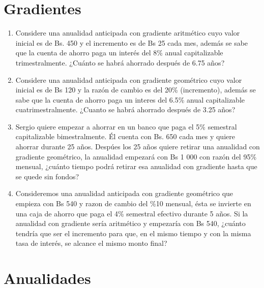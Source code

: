 \documentclass{article}
\begin{document}
\section{Gradientes}
\begin{enumerate}
    \item Considere una anualidad anticipada con gradiente aritmético cuyo valor inicial es de Bs. 450 y el incremento es de Bs 25 cada mes, además se sabe que la cuenta de ahorro paga un interés del 8\% anual capitalizable trimestralmente. ¿Cuánto se habrá ahorrado después de 6.75 años?
    \item Considere una anualidad anticipada con gradiente geométrico cuyo valor inicial es de Bs 120 y la razón de cambio es del 20\% (incremento), además se sabe que la cuenta de ahorro paga un interes del 6.5\% anual capitalizable cuatrimestralmente. ¿Cuanto se habrá ahorrado después de 3.25 años?
    \item Sergio quiere empezar a ahorrar en un banco que paga el 5\% semestral capitalizable bimestralmente. Él cuenta con Bs. 650 cada mes y quiere ahorrar durante 25 años. Despúes los 25 años quiere retirar una anualidad con gradiente geométrico, la anualidad empezará con Bs 1 000 con razón del 95\% mensual, ¿cuánto tiempo podrá retirar esa anualidad con gradiente hasta que se quede sin fondos?
    \item Consideremos una anualidad anticipada con gradiente geométrico que empieza con Bs 540 y razon de cambio del \%10 mensual, ésta se invierte en una caja de ahorro que paga el 4\% semestral efectivo durante 5 años. Si la anualidad con gradiente sería aritmético y empezaría con Bs 540, ¿cuánto tendría que ser el incremento para que, en el mismo tiempo y con la misma tasa de interés, se alcance el mismo monto final?  
\end{enumerate}
\section{Anualidades}
\end{document}
